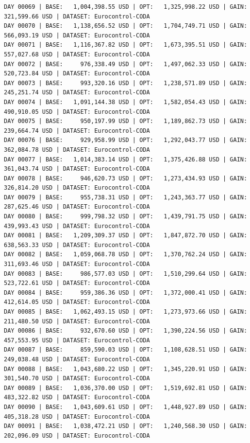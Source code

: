 \documentclass[11pt,a4paper]{article}
\begin{document}
\begin{verbatim}
DAY 00069 | BASE:   1,004,398.55 USD | OPT:   1,325,998.22 USD | GAIN: 321,599.66 USD | DATASET: Eurocontrol-CODA
DAY 00070 | BASE:   1,138,656.52 USD | OPT:   1,704,749.71 USD | GAIN: 566,093.19 USD | DATASET: Eurocontrol-CODA
DAY 00071 | BASE:   1,116,367.82 USD | OPT:   1,673,395.51 USD | GAIN: 557,027.68 USD | DATASET: Eurocontrol-CODA
DAY 00072 | BASE:     976,338.49 USD | OPT:   1,497,062.33 USD | GAIN: 520,723.84 USD | DATASET: Eurocontrol-CODA
DAY 00073 | BASE:     993,320.16 USD | OPT:   1,238,571.89 USD | GAIN: 245,251.74 USD | DATASET: Eurocontrol-CODA
DAY 00074 | BASE:   1,091,144.38 USD | OPT:   1,582,054.43 USD | GAIN: 490,910.05 USD | DATASET: Eurocontrol-CODA
DAY 00075 | BASE:     950,197.99 USD | OPT:   1,189,862.73 USD | GAIN: 239,664.74 USD | DATASET: Eurocontrol-CODA
DAY 00076 | BASE:     929,958.99 USD | OPT:   1,292,043.77 USD | GAIN: 362,084.78 USD | DATASET: Eurocontrol-CODA
DAY 00077 | BASE:   1,014,383.14 USD | OPT:   1,375,426.88 USD | GAIN: 361,043.74 USD | DATASET: Eurocontrol-CODA
DAY 00078 | BASE:     946,620.73 USD | OPT:   1,273,434.93 USD | GAIN: 326,814.20 USD | DATASET: Eurocontrol-CODA
DAY 00079 | BASE:     955,738.31 USD | OPT:   1,243,363.77 USD | GAIN: 287,625.46 USD | DATASET: Eurocontrol-CODA
DAY 00080 | BASE:     999,798.32 USD | OPT:   1,439,791.75 USD | GAIN: 439,993.43 USD | DATASET: Eurocontrol-CODA
DAY 00081 | BASE:   1,209,309.37 USD | OPT:   1,847,872.70 USD | GAIN: 638,563.33 USD | DATASET: Eurocontrol-CODA
DAY 00082 | BASE:   1,059,068.78 USD | OPT:   1,370,762.24 USD | GAIN: 311,693.46 USD | DATASET: Eurocontrol-CODA
DAY 00083 | BASE:     986,577.03 USD | OPT:   1,510,299.64 USD | GAIN: 523,722.61 USD | DATASET: Eurocontrol-CODA
DAY 00084 | BASE:     959,386.36 USD | OPT:   1,372,000.41 USD | GAIN: 412,614.05 USD | DATASET: Eurocontrol-CODA
DAY 00085 | BASE:   1,062,493.15 USD | OPT:   1,273,973.66 USD | GAIN: 211,480.50 USD | DATASET: Eurocontrol-CODA
DAY 00086 | BASE:     932,670.60 USD | OPT:   1,390,224.56 USD | GAIN: 457,553.95 USD | DATASET: Eurocontrol-CODA
DAY 00087 | BASE:     859,590.03 USD | OPT:   1,108,628.51 USD | GAIN: 249,038.48 USD | DATASET: Eurocontrol-CODA
DAY 00088 | BASE:   1,043,680.22 USD | OPT:   1,345,220.91 USD | GAIN: 301,540.70 USD | DATASET: Eurocontrol-CODA
DAY 00089 | BASE:   1,036,370.00 USD | OPT:   1,519,692.81 USD | GAIN: 483,322.82 USD | DATASET: Eurocontrol-CODA
DAY 00090 | BASE:   1,043,609.61 USD | OPT:   1,448,927.89 USD | GAIN: 405,318.28 USD | DATASET: Eurocontrol-CODA
DAY 00091 | BASE:   1,038,472.21 USD | OPT:   1,240,568.30 USD | GAIN: 202,096.09 USD | DATASET: Eurocontrol-CODA

\end{verbatim}
\end{document}
